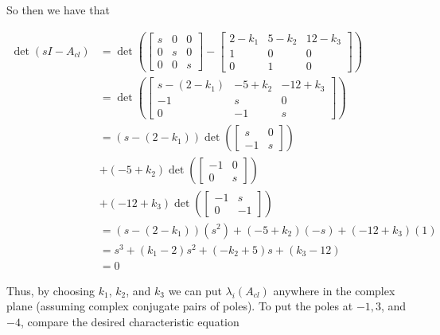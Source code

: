 \documentclass[main.tex]{subfiles}
\begin{document}
\begin{enumerate}
\begin{enumerate}
    So then we have that
    
    $$
    \begin{aligned}
    \operatorname{det}\left(s I-A_{c l}\right) &= \operatorname{det}\left(\left[\begin{array}{ccc}
    s & 0 & 0 \\
    0 & s & 0 \\
    0 & 0 & s
    \end{array}\right] - \left[\begin{array}{ccc}
    2-k_1 & 5-k_2 & 12-k_3 \\
    1 & 0 & 0 \\
    0 & 1 & 0
    \end{array}\right] \right)\\
    &=\operatorname{det}\left(\left[\begin{array}{ccc}
    s-\left(2-k_1\right) & -5+k_2 & -12+k_3 \\
    -1 & s & 0 \\
    0 & -1 & s
    \end{array}\right]\right) \\
    &=\left(s-\left(2-k_1\right)\right) \operatorname{det}\left(\left[\begin{array}{cc}
    s & 0 \\
    -1 & s
    \end{array}\right]\right)\\
    &+\left(-5+k_2\right) \operatorname{det}\left(\left[\begin{array}{cc}
    -1 & 0 \\
    0 & s
    \end{array}\right]\right)\\
    &+\left(-12+k_3\right) \operatorname{det}\left(\left[\begin{array}{cc}
    -1 & s \\
    0 & -1
    \end{array}\right]\right) \\
    & = \left(s-\left(2-k_1\right)\right)\left(s^2\right)+\left(-5+k_2\right)(-s)+\left(-12+k_3\right)(1)\\
    & = s^3 + (k_1-2)s^2 + (-k_2 + 5)s + (k_3 - 12)\\
    & = 0
    \end{aligned}
    $$
    
    Thus, by choosing $k_1$, $k_2$, and $k_3$ we can put $\lambda_i\left(A_{c l}\right)$ anywhere in the complex plane (assuming complex conjugate pairs of poles). To put the poles at $-1, 3$, and $-4$, compare the desired characteristic equation
    

\end{enumerate}
\end{enumerate}
\end{document}

